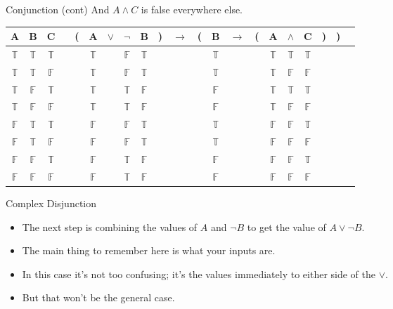 \documentclass[
  ignorenonframetext,
]{beamer}
\providecommand{\tightlist}{%
  \setlength{\itemsep}{0pt}\setlength{\parskip}{0pt}}
\renewcommand{\,}{\text{, }}
\def\True{\mathbb{T}}
\def\False{\mathbb{F}}
\begin{document}
\begin{frame}{Conjunction (cont)}
\protect\hypertarget{conjunction-cont}{}
And \(A \wedge C\) is false everywhere else.

\begin{center}
\begin{tabular}{@{ }c@{ }@{ }c@{ }@{ }c | c@{ }@{}c@{}@{ }c@{ }@{ }c@{ }@{ }c@{ }@{ }c@{ }@{}c@{}@{ }c@{ }@{}c@{}@{ }c@{ }@{ }c@{ }@{}c@{}@{ }c@{ }@{ }c@{ }@{ }c@{ }@{}c@{}@{}c@{}@{ }c}
A & B & C &  & ( & A & $\vee$ & $\neg$ & B & ) & $\rightarrow$ & ( & B & $\rightarrow$ & ( & A & $\wedge$ & C & ) & ) & \\
\hline 
 $\True$ & $\True$ & $\True$ &  &  & $\True$ && $\False$ & $\True$ &  &&  & $\True$ &&  & $\True$ & $\True$ & $\True$ &  &  & \\
 $\True$ & $\True$ & $\False$ &  &  & $\True$ && $\False$ & $\True$ &  &&  & $\True$ &&  & $\True$ & $\False$ & $\False$ &  &  & \\
 $\True$ & $\False$ & $\True$ &  &  & $\True$ && $\True$ & $\False$ &  &&  & $\False$ &&  & $\True$ & $\True$ & $\True$ &  &  & \\
 $\True$ & $\False$ & $\False$ &  &  & $\True$ && $\True$ & $\False$ &  &&  & $\False$ &&  & $\True$ & $\False$ & $\False$ &  &  & \\
 $\False$ & $\True$ & $\True$ &  &  & $\False$ && $\False$ & $\True$ &  &&  & $\True$ &&  & $\False$ & $\False$ & $\True$ &  &  & \\
 $\False$ & $\True$ & $\False$ &  &  & $\False$ && $\False$ & $\True$ &  &&  & $\True$ &&  & $\False$ & $\False$ & $\False$ &  &  & \\
 $\False$ & $\False$ & $\True$ &  &  & $\False$ && $\True$ & $\False$ &  &&  & $\False$ &&  & $\False$ & $\False$ & $\True$ &  &  & \\
 $\False$ & $\False$ & $\False$ &  &  & $\False$ && $\True$ & $\False$ &  &&  & $\False$ &&  & $\False$ & $\False$ & $\False$ &  &  & \\
\end{tabular}
\end{center}
\end{frame}

\begin{frame}{Complex Disjunction}
\protect\hypertarget{complex-disjunction}{}
\begin{itemize}
\tightlist
\item
  The next step is combining the values of \(A\) and \(\neg B\) to get
  the value of \(A \vee \neg B\).
\item
  The main thing to remember here is what your inputs are.
\item
  In this case it's not too confusing; it's the values immediately to
  either side of the \(\vee\).
\item
  But that won't be the general case.
\end{itemize}
\end{frame}
\end{document}
